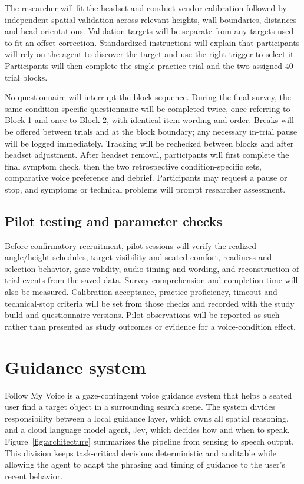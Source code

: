 \documentclass[11pt,letterpaper]{article}
\begin{document}
The researcher will fit the headset and conduct vendor calibration followed by independent spatial validation across relevant heights, wall boundaries, distances and head orientations. Validation targets will be separate from any targets used to fit an offset correction. Standardized instructions will explain that participants will rely on the agent to discover the target and use the right trigger to select it. Participants will then complete the single practice trial and the two assigned 40-trial blocks.

No questionnaire will interrupt the block sequence. During the final survey, the same condition-specific questionnaire will be completed twice, once referring to Block 1 and once to Block 2, with identical item wording and order. Breaks will be offered between trials and at the block boundary; any necessary in-trial pause will be logged immediately. Tracking will be rechecked between blocks and after headset adjustment. After headset removal, participants will first complete the final symptom check, then the two retrospective condition-specific sets, comparative voice preference and debrief. Participants may request a pause or stop, and symptoms or technical problems will prompt researcher assessment.

\subsection{Pilot testing and parameter checks}
Before confirmatory recruitment, pilot sessions will verify the realized angle/height schedules, target visibility and seated comfort, readiness and selection behavior, gaze validity, audio timing and wording, and reconstruction of trial events from the saved data. Survey comprehension and completion time will also be measured. Calibration acceptance, practice proficiency, timeout and technical-stop criteria will be set from those checks and recorded with the study build and questionnaire versions. Pilot observations will be reported as such rather than presented as study outcomes or evidence for a voice-condition effect.

\section{Guidance system}
Follow My Voice is a gaze-contingent voice guidance system that helps a seated user find a target object in a surrounding search scene. The system divides responsibility between a local guidance layer, which owns all spatial reasoning, and a cloud language model agent, Jev, which decides how and when to speak. Figure~\ref{fig:architecture} summarizes the pipeline from sensing to speech output. This division keeps task-critical decisions deterministic and auditable while allowing the agent to adapt the phrasing and timing of guidance to the user's recent behavior.
\end{document}
